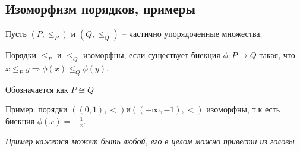 \subsection{Изоморфизм порядков, примеры}

Пусть $(P, \le_P)$ и $(Q, \le_Q)$ -- частично упорядоченные множества.

Порядки $\le_P$ и $\le_Q$ изоморфны, если существует биекция $\phi: P \rightarrow Q$ такая, что $x \le_P y \Rightarrow \phi(x) \le_Q \phi(y)$.

Обозначается как $P \cong Q$

Пример: порядки $((0, 1), <) и ((-\infty, -1), <)$ изоморфны, т.к есть биекция $\phi(x) = -\frac{1}{x}$.

\textit{Пример кажется может быть любой, его в целом можно привести из головы}
